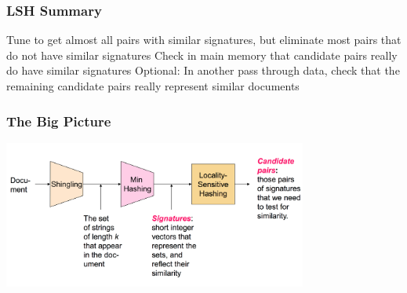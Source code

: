 \documentclass[svgnames]{beamer}
\begin{document}
\begin{frame} \frametitle{LSH Summary}

Tune to get almost all pairs with similar signatures, but eliminate most pairs that do not have similar signatures
Check in main memory that candidate pairs really do have similar signatures
Optional: In another pass through data, check that the remaining candidate pairs really represent similar documents

\end{frame}

  
\begin{frame} \frametitle{The Big Picture}

\includegraphics[width=10cm]{overall}

\end{frame}


\end{document}
